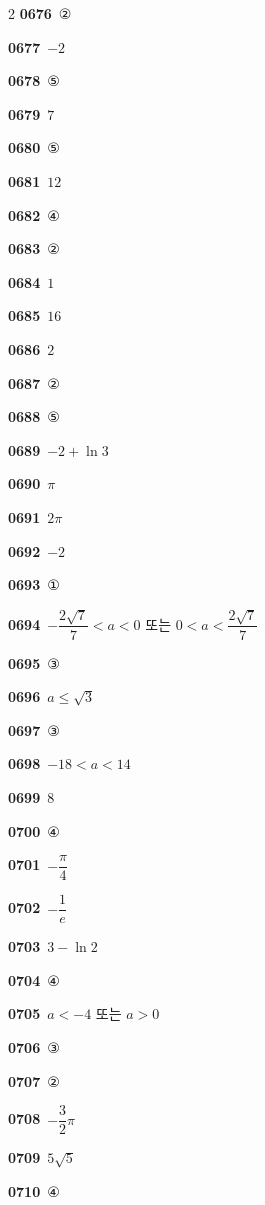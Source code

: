\documentclass[10pt,a4paper]{article}
\begin{document}
\begin{multicols}{2}
\noindent\textbf{0676}\ ②\par
\noindent\textbf{0677}\ $-2$\par
\noindent\textbf{0678}\ ⑤\par
\noindent\textbf{0679}\ $7$\par
\noindent\textbf{0680}\ ⑤\par
\noindent\textbf{0681}\ $12$\par
\noindent\textbf{0682}\ ④\par
\noindent\textbf{0683}\ ②\par
\noindent\textbf{0684}\ $1$\par
\noindent\textbf{0685}\ $16$\par
\noindent\textbf{0686}\ $2$\par
\noindent\textbf{0687}\ ②\par
\noindent\textbf{0688}\ ⑤\par
\noindent\textbf{0689}\ $-2+\ln 3$\par
\noindent\textbf{0690}\ $\pi$\par
\noindent\textbf{0691}\ $2\pi$\par
\noindent\textbf{0692}\ $-2$\par
\noindent\textbf{0693}\ ①\par
\noindent\textbf{0694}\ $-\dfrac{2\sqrt{7}}{7}<a<0$ 또는 $0<a<\dfrac{2\sqrt{7}}{7}$\par
\noindent\textbf{0695}\ ③\par
\noindent\textbf{0696}\ $a\le\sqrt{3}$\par
\noindent\textbf{0697}\ ③\par
\noindent\textbf{0698}\ $-18<a<14$\par
\noindent\textbf{0699}\ $8$\par
\noindent\textbf{0700}\ ④\par
\noindent\textbf{0701}\ $-\dfrac{\pi}{4}$\par
\noindent\textbf{0702}\ $-\dfrac{1}{e}$\par
\noindent\textbf{0703}\ $3-\ln 2$\par
\noindent\textbf{0704}\ ④\par
\noindent\textbf{0705}\ $a<-4$ 또는 $a>0$\par
\noindent\textbf{0706}\ ③\par
\noindent\textbf{0707}\ ②\par
\noindent\textbf{0708}\ $-\dfrac{3}{2}\pi$\par
\noindent\textbf{0709}\ $5\sqrt{5}$\par
\noindent\textbf{0710}\ ④\par

\end{multicols}
\end{document}
